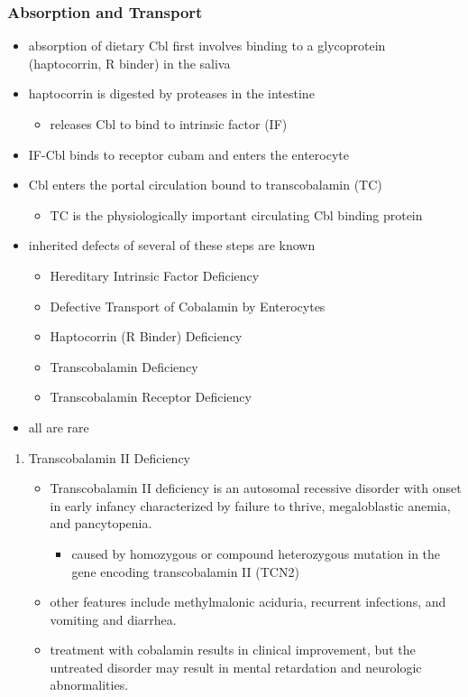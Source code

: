 \documentclass[12pt]{scrartcl}
\begin{document}
\subsubsection{Absorption and Transport}
\label{sec:org10112e0}
\begin{itemize}
\item absorption of dietary Cbl first involves binding to a glycoprotein
(haptocorrin, R binder) in the saliva
\item haptocorrin is digested by proteases in the intestine
\begin{itemize}
\item releases Cbl to bind to intrinsic factor (IF)
\end{itemize}
\item IF-Cbl binds to receptor cubam and enters the enterocyte
\item Cbl enters the portal circulation bound to transcobalamin (TC)
\begin{itemize}
\item TC is the physiologically important circulating Cbl binding
protein
\end{itemize}
\item inherited defects of several of these steps are known
\begin{itemize}
\item Hereditary Intrinsic Factor Deficiency
\item Defective Transport of Cobalamin by Enterocytes
\item Haptocorrin (R Binder) Deficiency
\item Transcobalamin Deficiency
\item Transcobalamin Receptor Deficiency
\end{itemize}
\item all are rare
\end{itemize}
\begin{enumerate}
\item Transcobalamin II Deficiency
\label{sec:orgdf5185f}
\begin{itemize}
\item Transcobalamin II deficiency is an autosomal recessive disorder with
onset in early infancy characterized by failure to thrive,
megaloblastic anemia, and pancytopenia.
\begin{itemize}
\item caused by homozygous or compound heterozygous mutation in the gene encoding
transcobalamin II (TCN2)
\end{itemize}
\item other features include methylmalonic aciduria, recurrent infections,
and vomiting and diarrhea.
\item treatment with cobalamin results in clinical improvement, but the
untreated disorder may result in mental retardation and neurologic
abnormalities.
\end{itemize}
\end{enumerate}
\end{document}
